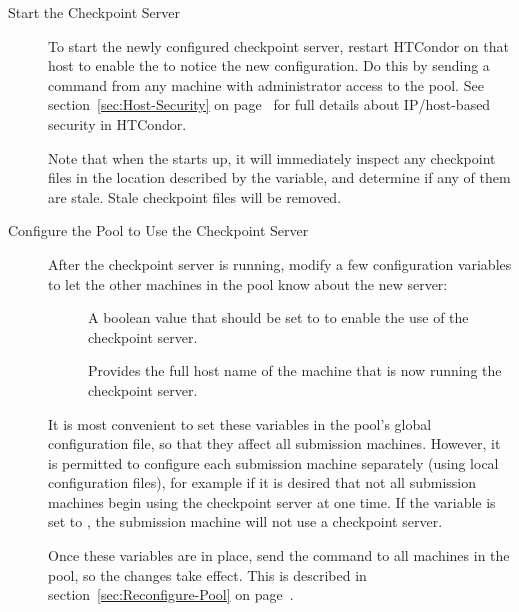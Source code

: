 \begin{description}
\begin{description}
\end{description}

\item[Start the Checkpoint Server]

To start the newly configured checkpoint server,
restart HTCondor on that host to enable
the  to notice the new configuration.
Do this by sending a  command from any machine
with administrator access to the pool.
See section~\ref{sec:Host-Security} on
page~\pageref{sec:Host-Security} for full details about IP/host-based
security in HTCondor. 

Note that when the  starts up, it will immediately
inspect any checkpoint files in the location described by the
 variable, and determine if any of them are stale.
Stale checkpoint files will be removed.

\item[Configure the Pool to Use the Checkpoint Server]

After the checkpoint server is running,
modify a few configuration variables to let the other machines in the pool
know about the new server:

\begin{description}
   \item[] A boolean value that should be set to
    to enable the use of the checkpoint server.

   \item[] Provides the full host name 
   of the machine that is now running the checkpoint server.  
\end{description}

It is most convenient to set these variables in the pool's
global configuration file,
so that they affect all submission machines.
However, it is permitted to configure each submission machine separately
(using local configuration files), for example if it is desired that not all
submission machines begin using the checkpoint server at one time.
If the variable  is set to ,
the submission machine will not use a checkpoint server.

Once these variables are in place,
send the command  to all machines in the pool,
so the changes take effect.
This is described in section~\ref{sec:Reconfigure-Pool} on
page~\pageref{sec:Reconfigure-Pool}.

\end{description}

